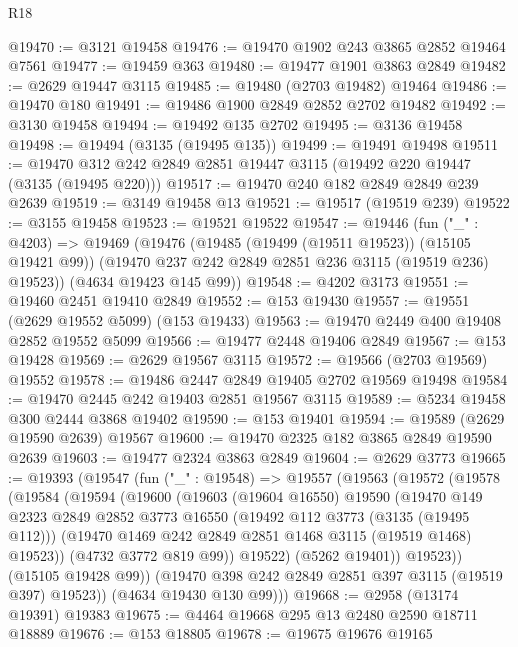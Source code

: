 \begin{lexlean}{R18}
\begin{coremodule}
@19470 := @3121 @19458
@19476 := @19470 @1902 @243 @3865 @2852 @19464 @7561
@19477 := @19459 @363
@19480 := @19477 @1901 @3863 @2849
@19482 := @2629 @19447 @3115
@19485 := @19480 (@2703 @19482) @19464
@19486 := @19470 @180
@19491 := @19486 @1900 @2849 @2852 @2702 @19482
@19492 := @3130 @19458
@19494 := @19492 @135 @2702
@19495 := @3136 @19458
@19498 := @19494 (@3135 (@19495 @135))
@19499 := @19491 @19498
@19511 := @19470 @312 @242 @2849 @2851 @19447 @3115 (@19492 @220 @19447 (@3135 (@19495 @220)))
@19517 := @19470 @240 @182 @2849 @2849 @239 @2639
@19519 := @3149 @19458 @13
@19521 := @19517 (@19519 @239)
@19522 := @3155 @19458
@19523 := @19521 @19522
@19547 := @19446
    (fun ("_" : @4203) =>
    @19469
      (@19476
        (@19485 (@19499 (@19511 @19523)) (@15105 @19421 @99))
        (@19470 @237 @242 @2849 @2851 @236 @3115 (@19519 @236) @19523))
      (@4634 @19423 @145 @99))
@19548 := @4202 @3173
@19551 := @19460 @2451 @19410 @2849
@19552 := @153 @19430
@19557 := @19551 (@2629 @19552 @5099) (@153 @19433)
@19563 := @19470 @2449 @400 @19408 @2852 @19552 @5099
@19566 := @19477 @2448 @19406 @2849
@19567 := @153 @19428
@19569 := @2629 @19567 @3115
@19572 := @19566 (@2703 @19569) @19552
@19578 := @19486 @2447 @2849 @19405 @2702 @19569 @19498
@19584 := @19470 @2445 @242 @19403 @2851 @19567 @3115
@19589 := @5234 @19458 @300 @2444 @3868 @19402
@19590 := @153 @19401
@19594 := @19589 (@2629 @19590 @2639) @19567
@19600 := @19470 @2325 @182 @3865 @2849 @19590 @2639
@19603 := @19477 @2324 @3863 @2849
@19604 := @2629 @3773
@19665 := @19393
    (@19547
      (fun ("_" : @19548) =>
      @19557
        (@19563
          (@19572
            (@19578
              (@19584
                (@19594
                  (@19600
                    (@19603
                      (@19604 @16550)
                      @19590
                      (@19470
                        @149
                        @2323
                        @2849
                        @2852
                        @3773
                        @16550
                        (@19492 @112 @3773 (@3135 (@19495 @112)))
                        (@19470 @1469 @242 @2849 @2851 @1468 @3115 (@19519 @1468) @19523))
                      (@4732 @3772 @819 @99))
                    @19522)
                  (@5262 @19401))
                @19523))
            (@15105 @19428 @99))
          (@19470 @398 @242 @2849 @2851 @397 @3115 (@19519 @397) @19523))
        (@4634 @19430 @130 @99)))
@19668 := @2958 (@13174 @19391) @19383
@19675 := @4464 @19668 @295 @13 @2480 @2590 @18711 @18889
@19676 := @153 @18805
@19678 := @19675 @19676 @19165

\end{coremodule}
\end{lexlean}
